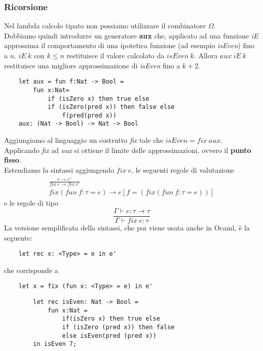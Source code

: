 \subsubsection{Ricorsione}
Nel lambda calcolo tipato non possiamo utilizzare il combinatore $\Omega$.\\ Dobbiamo quindi introdurre un generatore \textbf{aux} che, applicato ad una funzione \textit{iE} approssima il comportamento di una ipotetica funzione (ad esempio \textit{isEven}) fino a $n$. $iE \: k$ con $k \leq n$  restituisce il valore calcolato da $isEven \: k$. Allora $aux \: iE \: k$ restituisce  una migliore approssimazione di \textit{isEven} fino a $k+2$.
\begin{lstlisting}
	let aux = fun f:Nat -> Bool =
		fun x:Nat=
			if (isZero x) then true else
			if (isZero(pred x)) then false else
				f(pred(pred x))
	aux: (Nat -> Bool) -> Nat -> Bool
\end{lstlisting}
Aggiungiamo al linguaggio un costrutto \textit{fix} tale che $isEven = fix \: aux$. Applicando \textit{fix} ad \textit{aux} si ottiene il limite delle approssimazioni, ovvero il \textbf{punto fisso}.\\
Estendiamo la sintassi aggiungendo $fix \: e$, le seguenti regole di valutazione
\begin{gather}
	\frac{e \rightarrow e'}{fix \: e \rightarrow fix \: e'}\\
	fix(fun \: f:\tau = e) \rightarrow e [f = (fix (fun \: f:\tau = e))]
\end{gather}
e le regole di tipo
\begin{equation}
	\frac{\Gamma \vdash e:\tau \rightarrow \tau}{\Gamma \vdash fix \: e: \tau}
\end{equation}
La versione semplificata della sintassi, che poi viene usata anche in Ocaml, è la seguente:
\begin{lstlisting}
	let rec x: <Type> = e in e'
\end{lstlisting}
che corrisponde a
\begin{lstlisting}
	let x = fix (fun x: <Type> = e) in e'
\end{lstlisting}

\begin{example}
	\begin{lstlisting}
		let rec isEven: Nat -> Bool =
			fun x:Nat =
				if(isZero x) then true else
				if (isZero (pred x)) then false
				else isEven(pred (pred x))
		in isEven 7;
	\end{lstlisting}
\end{example}
